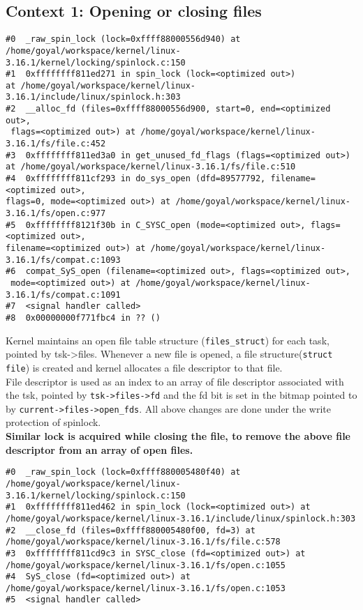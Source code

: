 \documentclass[10pt] {article}
\begin{document}
\subsection{Context 1: Opening or closing files}
\begin{lstlisting}
#0  _raw_spin_lock (lock=0xffff88000556d940) at 
/home/goyal/workspace/kernel/linux-3.16.1/kernel/locking/spinlock.c:150
#1  0xffffffff811ed271 in spin_lock (lock=<optimized out>) 
at /home/goyal/workspace/kernel/linux-3.16.1/include/linux/spinlock.h:303
#2  __alloc_fd (files=0xffff88000556d900, start=0, end=<optimized out>,
 flags=<optimized out>) at /home/goyal/workspace/kernel/linux-3.16.1/fs/file.c:452
#3  0xffffffff811ed3a0 in get_unused_fd_flags (flags=<optimized out>) 
at /home/goyal/workspace/kernel/linux-3.16.1/fs/file.c:510
#4  0xffffffff811cf293 in do_sys_open (dfd=89577792, filename=<optimized out>, 
flags=0, mode=<optimized out>) at /home/goyal/workspace/kernel/linux-3.16.1/fs/open.c:977
#5  0xffffffff8121f30b in C_SYSC_open (mode=<optimized out>, flags=<optimized out>, 
filename=<optimized out>) at /home/goyal/workspace/kernel/linux-3.16.1/fs/compat.c:1093
#6  compat_SyS_open (filename=<optimized out>, flags=<optimized out>,
 mode=<optimized out>) at /home/goyal/workspace/kernel/linux-3.16.1/fs/compat.c:1091
#7  <signal handler called>
#8  0x00000000f771fbc4 in ?? ()
\end{lstlisting}


\noindent Kernel maintains an open file table structure (\texttt{files\_struct}) for each task, pointed by tsk->files. Whenever a new file is opened, a file structure(\texttt{struct file}) is created and kernel allocates a file descriptor to that file. \\

\noindent File descriptor is used as an index to an array of file descriptor associated with the tsk, pointed by \texttt{tsk->files->fd} and the fd bit is set in the bitmap pointed to by \texttt{current->files->open\_fds}. All above changes are done under the write protection of spinlock. \\


\noindent \textbf{Similar lock is acquired while closing the file, to remove the above file descriptor from an array of open files.}


\begin{lstlisting}
#0  _raw_spin_lock (lock=0xffff880005480f40) at 
/home/goyal/workspace/kernel/linux-3.16.1/kernel/locking/spinlock.c:150
#1  0xffffffff811ed462 in spin_lock (lock=<optimized out>) at 
/home/goyal/workspace/kernel/linux-3.16.1/include/linux/spinlock.h:303
#2  __close_fd (files=0xffff880005480f00, fd=3) at 
/home/goyal/workspace/kernel/linux-3.16.1/fs/file.c:578
#3  0xffffffff811cd9c3 in SYSC_close (fd=<optimized out>) at 
/home/goyal/workspace/kernel/linux-3.16.1/fs/open.c:1055
#4  SyS_close (fd=<optimized out>) at 
/home/goyal/workspace/kernel/linux-3.16.1/fs/open.c:1053
#5  <signal handler called>
\end{lstlisting}
\end{document}
